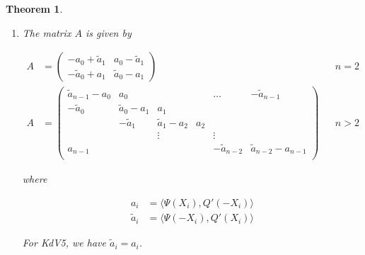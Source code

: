 \documentclass[12pt]{article}
\newtheorem{theorem}{Theorem}
\begin{document}
\begin{theorem}
\begin{enumerate}
\begin{equation}
K(\lambda) = 
\begin{pmatrix}
e^{-\nu(\lambda)X_1} & & & & & -e^{\nu(\lambda)X_0} \\
-e^{\nu(\lambda)X_1} & e^{-\nu(\lambda)X_2} \\
& -e^{\nu(\lambda)X_2} & e^{-\nu(\lambda)X_3} \\
\vdots & & \vdots & &&  \vdots \\
& & & & -e^{\nu(\lambda)X_{n-1}} & e^{-\nu(\lambda)X_0} 
\end{pmatrix}
\end{equation}

where $\nu(\lambda)$ is the small eigenvalue of the asympotic matrix $A(\lambda)$.

\item The matrix $A$ is given by

\begin{align*}
A &= \begin{pmatrix}
-a_0 + \tilde{a}_1 & a_0 - \tilde{a}_1 \\
-\tilde{a}_0 + a_1 & \tilde{a}_0 - a_1
\end{pmatrix} && n = 2 \\
A &= \begin{pmatrix}
\tilde{a}_{n-1} - a_0 & a_0 & & & \dots & -\tilde{a}_{n-1}\\
-\tilde{a}_0 & \tilde{a}_0 - a_1 &  a_1 \\
& -\tilde{a}_1 & \tilde{a}_1 - a_2 &  a_2 \\
& & \vdots & & \vdots \\
a_{n-1} & & & & -\tilde{a}_{n-2} & \tilde{a}_{n-2} - a_{n-1} \\
\end{pmatrix} && n > 2
\end{align*}

where

\begin{align*}
a_i &= \langle \Psi(X_i), Q'(-X_i) \rangle \\
\tilde{a}_i &= \langle \Psi(-X_i), Q'(X_i) \rangle
\end{align*}

For KdV5, we have $\tilde{a}_i = a_i$.

\end{enumerate}




\end{theorem}
\end{document}
